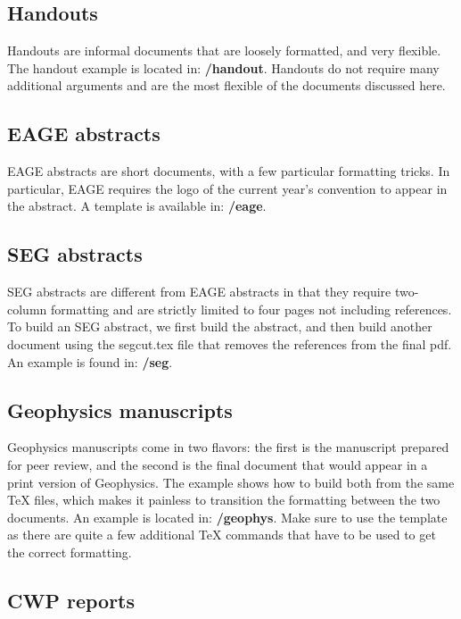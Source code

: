 \subsection{Handouts}

Handouts are informal documents that are loosely formatted, and very flexible.  The handout example is located in: \textbf{\exampledir/handout}.  Handouts do not require many additional arguments and are the most flexible of the documents discussed here.

\subsection{EAGE abstracts}

EAGE abstracts are short documents, with a few particular formatting tricks. In particular, EAGE requires the logo of the current year's convention to appear in the abstract.  A template is available in: \textbf{\exampledir/eage}.  

\subsection{SEG abstracts}

SEG abstracts are different from EAGE abstracts in that they require two-column formatting and are strictly limited to four pages not including references.  To build an SEG abstract, we first build the abstract, and then build another document using the segcut.tex file that removes the references from the final pdf.  An example is found in: \textbf{\exampledir/seg}.  

\subsection{Geophysics manuscripts}

Geophysics manuscripts come in two flavors: the first is the manuscript prepared for peer review, and the second is the final document that would appear in a print version of Geophysics.  The example shows how to build both from the same TeX files, which makes it painless to transition the formatting between the two documents.  An example is located in: \textbf{\exampledir/geophys}.  Make sure to use the template as there are quite a few additional TeX commands that have to be used to get the correct formatting.

\subsection{CWP reports}

